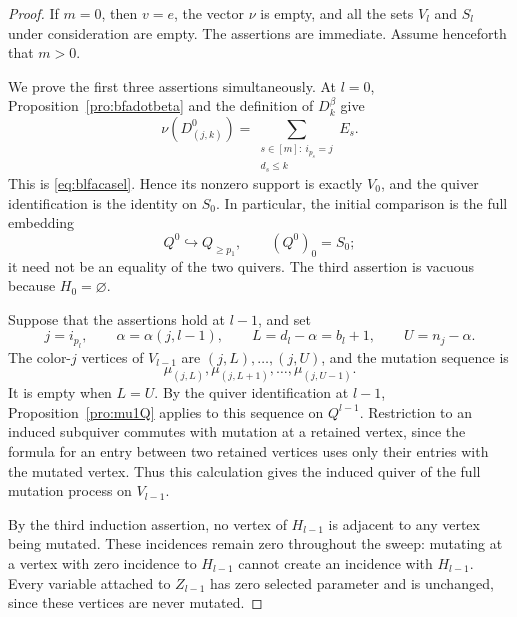 \documentclass[12pt, reqno]{amsart}
\theoremstyle{plain}
\theoremstyle{definition}
\numberwithin{equation}{section}
\begin{document}
\begin{proof}
If \(m=0\), then \(v=e\), the vector \(\nu\) is empty, and all the
sets \(V_l\) and \(S_l\) under consideration are empty. The assertions
are immediate. Assume henceforth that \(m>0\).

We prove the first three assertions simultaneously. At \(l=0\),
Proposition~\ref{pro:bfadotbeta} and the definition of \(D_k^\beta\)
give
\[
 \nu(D^0_{(j,k)})
 =\sum_{\substack{s\in[m]:\ i_{p_s}=j\\d_s\leq k}}E_{s}.
\]
This is \eqref{eq:blfacasel}. Hence its nonzero support is exactly
\(V_0\), and the quiver identification is the identity on \(S_0\).
In particular, the initial comparison is the full embedding
\begin{equation}\label{eq:Q0}
 Q^0\hookrightarrow Q_{\geq p_1},
 \qquad (Q^0)_0=S_0;
\end{equation}
it need not be an equality of the two quivers. The third assertion is
vacuous because \(H_0=\varnothing\).

Suppose that the assertions hold at \(l-1\), and set
\[
 j=i_{p_l},\qquad
 \alpha=\alpha(j,l-1),\qquad
 L=d_l-\alpha=b_l+1,\qquad U=n_j-\alpha.
\]
The color-\(j\) vertices of \(V_{l-1}\) are
\((j,L),\ldots,(j,U)\), and the mutation sequence is
\[
 \mu_{(j,L)},\mu_{(j,L+1)},\ldots,\mu_{(j,U-1)}.
\]
It is empty when \(L=U\). By the quiver identification at \(l-1\),
Proposition~\ref{pro:mu1Q} applies to this sequence on \(Q^{l-1}\).
Restriction to an induced subquiver commutes with mutation at a
retained vertex, since the formula for an entry between two retained
vertices uses only their entries with the mutated vertex. Thus this
calculation gives the induced quiver of the full mutation process on
\(V_{l-1}\).

By the third induction assertion, no vertex of \(H_{l-1}\) is
adjacent to any vertex being mutated. These incidences remain zero
throughout the sweep: mutating at a vertex with zero incidence to
\(H_{l-1}\) cannot create an incidence with \(H_{l-1}\).
Every variable attached to \(Z_{l-1}\) has zero selected parameter
and is unchanged, since these vertices are never mutated.


\end{proof}
\end{document}
